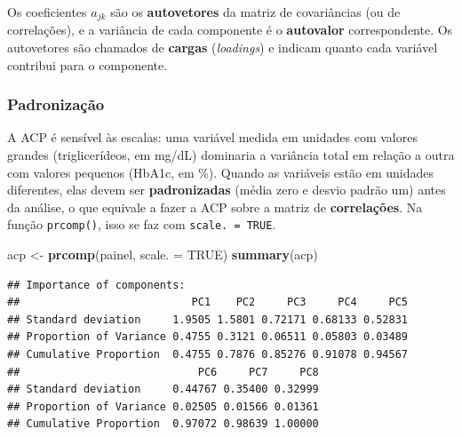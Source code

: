 \documentclass[
]{book}
\newenvironment{Shaded}{\begin{snugshade}}{\end{snugshade}}
\newcommand{\AttributeTok}[1]{\textcolor[rgb]{0.13,0.29,0.53}{#1}}
\newcommand{\CommentTok}[1]{\textcolor[rgb]{0.56,0.35,0.01}{\textit{#1}}}
\newcommand{\ConstantTok}[1]{\textcolor[rgb]{0.56,0.35,0.01}{#1}}
\newcommand{\DecValTok}[1]{\textcolor[rgb]{0.00,0.00,0.81}{#1}}
\newcommand{\FunctionTok}[1]{\textcolor[rgb]{0.13,0.29,0.53}{\textbf{#1}}}
\newcommand{\NormalTok}[1]{#1}
\newcommand{\OtherTok}[1]{\textcolor[rgb]{0.56,0.35,0.01}{#1}}
\newcommand{\SpecialCharTok}[1]{\textcolor[rgb]{0.81,0.36,0.00}{\textbf{#1}}}
\begin{document}
Os coeficientes \(a_{jk}\) são os \textbf{autovetores} da matriz de covariâncias (ou de correlações), e a variância de cada componente é o \textbf{autovalor} correspondente. Os autovetores são chamados de \textbf{cargas} (\emph{loadings}) e indicam quanto cada variável contribui para o componente.

\subsubsection{Padronização}\label{padronizauxe7uxe3o}

A ACP é sensível às escalas: uma variável medida em unidades com valores grandes (triglicerídeos, em mg/dL) dominaria a variância total em relação a outra com valores pequenos (HbA1c, em \%). Quando as variáveis estão em unidades diferentes, elas devem ser \textbf{padronizadas} (média zero e desvio padrão um) antes da análise, o que equivale a fazer a ACP sobre a matriz de \textbf{correlações}. Na função \texttt{prcomp()}, isso se faz com \texttt{scale.\ =\ TRUE}.

\begin{Shaded}
\begin{Highlighting}[]
\NormalTok{acp }\OtherTok{\textless{}{-}} \FunctionTok{prcomp}\NormalTok{(painel, }\AttributeTok{scale. =} \ConstantTok{TRUE}\NormalTok{)}
\FunctionTok{summary}\NormalTok{(acp)}
\end{Highlighting}
\end{Shaded}

\begin{verbatim}
## Importance of components:
##                           PC1    PC2     PC3     PC4     PC5
## Standard deviation     1.9505 1.5801 0.72171 0.68133 0.52831
## Proportion of Variance 0.4755 0.3121 0.06511 0.05803 0.03489
## Cumulative Proportion  0.4755 0.7876 0.85276 0.91078 0.94567
##                            PC6     PC7     PC8
## Standard deviation     0.44767 0.35400 0.32999
## Proportion of Variance 0.02505 0.01566 0.01361
## Cumulative Proportion  0.97072 0.98639 1.00000
\end{verbatim}

\begin{Shaded}
\end{Shaded}
\end{document}
